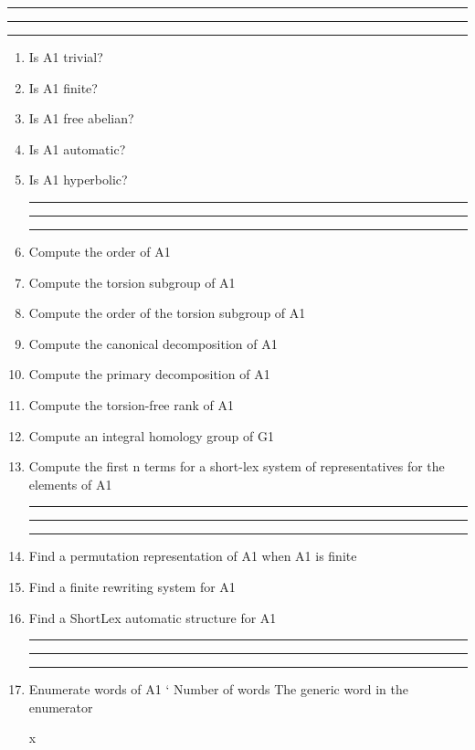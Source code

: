 
\bigskip
\hrule\hrule\hrule 
\begin{enumerate}

\item Is A1 trivial?

\item Is A1 finite?

\item Is A1 free abelian?

\item Is A1 automatic?

\item Is A1 hyperbolic?

\bigskip
\hrule\hrule\hrule

\item Compute the order of A1

\item Compute the torsion subgroup of A1

\item Compute the order of the torsion subgroup of A1

\item Compute the canonical decomposition of A1

\item Compute the primary decomposition of A1

\item Compute the torsion-free rank of A1

\item Compute an integral homology group of G1

\item Compute the first n terms for a short-lex system of representatives for the
elements of A1

\bigskip
\hrule\hrule\hrule

\item Find a permutation representation of A1 when A1 is finite

\item Find a finite rewriting system for A1

\item Find a ShortLex automatic structure for A1

\bigskip
\hrule\hrule\hrule

\item Enumerate words of A1
`
\subitem Number of words
\subsubitem The generic word in the enumerator

\hskip 2.0in    x


\end{enumerate}
